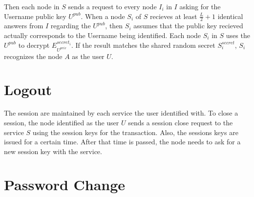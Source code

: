 Then each node in $S$ sends a request to every node $I_i$ in $I$ asking for the Username public key $U^{pub}$. When a node
$S_i$ of $S$ recieves at least $\frac{L}{2} + 1$ identical answers from
$I$ regarding the $U^{pub}$, then $S_i$ assumes that the public key recieved
actually corresponds to the Username being identified. Each node $S_i$ in $S$
uses the $U^{pub}$ to decrypt $E^{secret_i}_{U^{priv}}$. If the result matches
the shared random secret $S^{secret}_i$, $S_i$ recognizes the node $A$ as the
user $U$.


\section{Logout}
The session are maintained by each service the user identified with. To close a
session, the node identified as the user $U$ sends a session close request to
the service $S$ using the session keys for the transaction. Also, the sessions
keys are issued for a certain time. After that time is passed, the node needs
to ask for a new session key with the service.

 

\section{Password Change}

